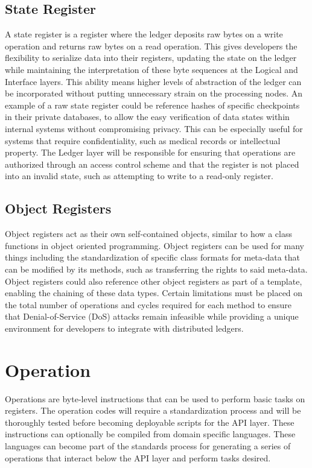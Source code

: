 \documentclass[11pt]{article}
\begin{document}
\subsection{State Register}

A state register is a register where the ledger deposits raw bytes on a write operation and returns raw bytes on a read operation.
This gives developers the flexibility to serialize data into their registers, updating the state on the ledger while maintaining the interpretation of these byte sequences at the Logical and Interface layers.
This ability means higher levels of abstraction of the ledger can be incorporated without putting unnecessary strain on the processing nodes.
An example of a raw state register could be reference hashes of specific checkpoints in their private databases, to allow the easy verification of data states within internal systems without compromising privacy.
This can be especially useful for systems that require confidentiality, such as medical records or intellectual property.
The Ledger layer will be responsible for ensuring that operations are authorized through an access control scheme and that the register is not placed into an invalid state, such as attempting to write to a read-only register.

\subsection{Object Registers}

Object registers act as their own self-contained objects, similar to how a class functions in object oriented programming.
Object registers can be used for many things including the standardization of specific class formats for meta-data that can be modified by its methods, such as transferring the rights to said meta-data.
Object registers could also reference other object registers as part of a template, enabling the chaining of these data types.
Certain limitations must be placed on the total number of operations and cycles required for each method to ensure that Denial-of-Service (DoS) attacks remain infeasible while providing a unique environment for developers to integrate with distributed ledgers.


\section{Operation}

Operations are byte-level instructions that can be used to perform basic tasks on registers.
The operation codes will require a standardization process and will be thoroughly tested before becoming deployable scripts for the API layer.
These instructions can optionally be compiled from domain specific languages.
These languages can become part of the standards process for generating a series of operations that interact below the API layer and perform tasks desired.
\end{document}
